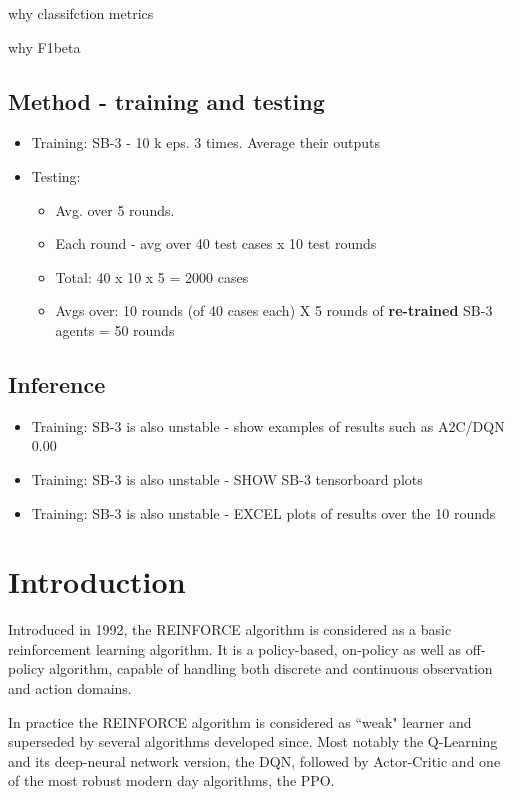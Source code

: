 \documentclass[]{article}
\begin{document}
\item why classifction metrics
\item why F1beta

\subsection{Method - training and testing}

\begin{itemize}
	\item Training: SB-3 - 10 k eps. 3 times. Average their outputs
	\item Testing: 
	\begin{itemize}
		\item Avg. over 5 rounds.
		\item Each round - avg over 40 test cases x 10 test rounds
		\item Total: 40 x 10 x 5 = 2000 cases
		\item Avgs over: 10 rounds (of 40 cases each) X 5 rounds of \textbf{re-trained} SB-3 agents = 50 rounds 
	\end{itemize}
\end{itemize}

\subsection{Inference}
\begin{itemize}
	\item Training: SB-3 is also unstable - show examples of results such as A2C/DQN 0.00 
	\item Training: SB-3 is also unstable - SHOW SB-3 tensorboard plots
	\item Training: SB-3 is also unstable - EXCEL plots of results over the 10 rounds 	
\end{itemize}


\section{Introduction}
Introduced in 1992, the REINFORCE algorithm is considered as a basic reinforcement learning algorithm. It is a policy-based, on-policy as well as off-policy algorithm, capable of handling both discrete and continuous observation and action domains.

In practice the REINFORCE algorithm is considered as ``weak" learner and superseded by several algorithms developed since. Most notably the Q-Learning and its deep-neural network version, the DQN, followed by Actor-Critic and one of the most robust modern day algorithms, the PPO. 
\end{document}

